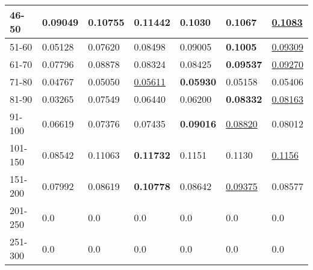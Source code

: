 \begin{table*}[]
\begin{tabular}{|l|l|l|l|l|l|l|}
    46-50   & 0.09049                        & 0.10755                        & \textbf{0.11442}               & 0.1030                         & 0.1067                         & \underline{0.1083}                         \\ \hline
    51-60   & 0.05128                        & 0.07620                        & 0.08498                        & 0.09005                        & \textbf{0.1005}                & \underline{0.09309}                        \\ \hline
    61-70   & 0.07796                        & 0.08878                        & 0.08324                        & 0.08425                        & \textbf{0.09537}               & \underline{0.09270}                        \\ \hline
    71-80   & 0.04767                        & 0.05050                        & \underline{0.05611}            & \textbf{0.05930}               & 0.05158                        & 0.05406                        \\ \hline
    81-90   & 0.03265                        & 0.07549                        & 0.06440                        & 0.06200                        & \textbf{0.08332}               & \underline{0.08163}                        \\ \hline
    91-100  & 0.06619                        & 0.07376                        & 0.07435                        & \textbf{0.09016}               & \underline{0.08820}            & 0.08012                        \\ \hline
    101-150 & 0.08542                        & 0.11063                        & \textbf{0.11732}               & 0.1151                         & 0.1130                         & \underline{0.1156}                        \\ \hline
    151-200 & 0.07992                        & 0.08619                        & \textbf{0.10778}               & 0.08642                        & \underline{0.09375}            & 0.08577                        \\ \hline
    201-250 & 0.0                            & 0.0                            & 0.0                            & 0.0                            & 0.0                            & 0.0                            \\ \hline
    251-300 & 0.0                            & 0.0                            & 0.0                            & 0.0                            & 0.0                            & 0.0                            \\ \hline

\end{tabular}
\end{table*}
